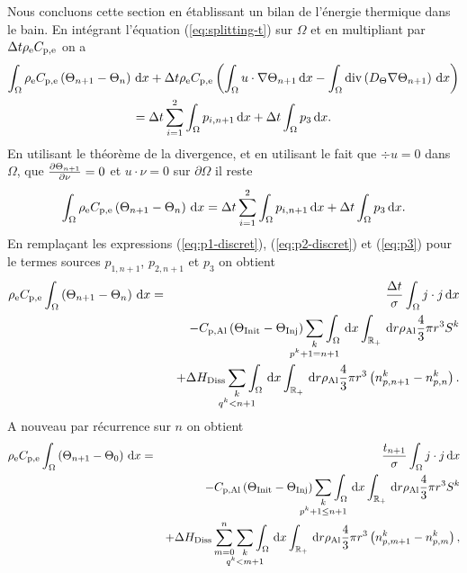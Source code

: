 Nous concluons cette section en établissant un bilan de l'énergie
thermique dans le bain. En intégrant l'équation (\ref{eq:splitting-t})
sur $\Omega$ et en multipliant par $\Delta t\rho_\mathrm{e}C_{\mathrm{p,e}}$
on a
\begin{multline}
\int_\Omega\rho_\mathrm{e}C_{\mathrm{p,e}}\left( \Theta_{n+1}
- \Theta_n \right)\,\mathrm dx
+\Delta t\rho_\mathrm{e}C_{\mathrm{p,e}}\left( \int_\Omega
  u\cdot\nabla\Theta_{n+1}\,\mathrm dx - \int_\Omega
  \mathrm{div}\left( D_\Theta\nabla\Theta_{n+1} \right)\,\mathrm dx \right) \\
= \Delta t\sum_{i=1}^2\int_\Omega p_{i,n+1}\,\mathrm dx + \Delta t\int_\Omega p_3\,\mathrm dx.
\end{multline}
En utilisant le théorème de la divergence, et en utilisant le fait que
$\div u = 0$ dans $\Omega$, que $\frac{\partial
  \Theta_{n+1}}{\partial \nu} = 0$ et $u\cdot \nu = 0$ sur
$\partial \Omega$ il reste
\begin{equation}
  \int_\Omega\rho_\mathrm{e}C_{\mathrm{p,e}}\left( \Theta_{n+1} - \Theta_n \right)\,\mathrm dx = \Delta t\sum_{i=1}^2\int_\Omega p_{i,n+1}\,\mathrm dx + \Delta t\int_\Omega p_3\,\mathrm dx.
\end{equation}
En remplaçant les expressions (\ref{eq:p1-discret}), (\ref{eq:p2-discret}) et (\ref{eq:p3}) pour le termes sources $p_{1,n+1}$, $p_{2,n+1}$ et $p_3$ on obtient
\begin{eqnarray*}
  \electrolytedensity\electrolytehc\int_\Omega\parent{\temperature_{n+1} - \temperature_n}\intd{x} &=& \frac{\dt}{ \conductivity}\int_\Omega j\cdot j\intd{x}\\
  && - \aluminahc\parent{\tinit - \tinj}\sum_{\mathclap{\substack{k\\ p^k + 1 = n+1}}}\int_\Omega\intd{x}\int_\rplus\intd{r} \aluminadensity \frac{4}{3}\pi r^3 S^k\\
  && + {\aluminadissolutionenthalpy}\sum_{\mathclap{\substack{k\\ q^k < n+1}}} \int_\Omega\intd{x}\int_\rplus\intd{r} \aluminadensity \frac{4}{3}\pi r^3\parent{n_{p,n+1}^k-n_{p,n}^k}.
\end{eqnarray*}
A nouveau par récurrence sur $n$ on obtient
\begin{eqnarray}
  \electrolytedensity\electrolytehc\int_\Omega\parent{\temperature_{n+1} - \temperature_0}\intd{x} &=& \frac{t_{n+1}}{\conductivity}\int_\Omega j\cdot j\intd{x}\nonumber\\
  && - \aluminahc\parent{\tinit - \tinj}\sum_{\mathclap{\substack{k\\ p^k + 1 \leq n+1}}}\int_\Omega\intd{x}\int_\rplus\intd{r} \aluminadensity \frac{4}{3}\pi r^3 S^k\nonumber\\
  && + {\aluminadissolutionenthalpy}\sum_{m =
    0}^{n}\sum_{\mathclap{\substack{k\\ q^k < m + 1}}}
  \int_\Omega\intd{x}\int_\rplus\intd{r} \aluminadensity \frac{4}{3}\pi
  r^3\parent{n_{p,m+1}^k-n_{p,m}^k},\nonumber\\ \label{eq:energy-mass-balance}
\end{eqnarray}
